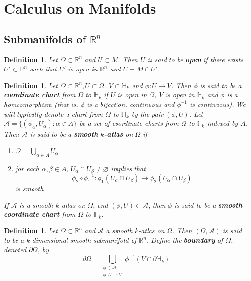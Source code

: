\documentclass[12pt]{amsart}
\newtheorem{defn}[thm]{Definition}
\newcommand{\al}{\alpha}
\newcommand{\Om}{\Omega}
\renewcommand{\H}{\mathbb{H}}
\newcommand{\R}{\mathbb{R}}
\newcommand{\MA}{\mathcal{A}}
\begin{document}
	

	
	
	

	
	\newpage	
	\section{Calculus on Manifolds}
	
	\subsection{Submanifolds of $\R^n$}
	
	\begin{defn}
		Let $\Om \subset \R^n$ and $U \subset M$. Then $U$ is said to be \textbf{open} if there exists $U' \subset \R^n$ such that $U'$ is open in $\R^n$ and $U = M \cap U'$.
	\end{defn}

	\begin{defn}
		Let $\Om \subset \R^n, U \subset \Om$, $V \subset \H_k$ and $\phi:U \rightarrow V$. Then $\phi$ is said to be a \textbf{coordinate chart} from $\Om$ to $\H_k$ if $U$ is open in $\Om$, $V$ is open in $\H_k$ and $\phi$ is a homeomorphism (that is, $\phi$ is a bijection, continuous and $\phi^{-1}$ is continuous). We will typically denote a chart from $\Om$ to $\H_k$ by the pair $(\phi, U)$. Let $\MA = \{(\phi_{\al}, U_{\al}): \al \in A\}$ be a set of coordinate charts from $\Om$ to $\H_k$ indexed by $A$. Then $\MA$ is said to be a \textbf{smooth $k$-atlas} on $\Om$ if 
		\begin{enumerate}
			\item $\Om = \bigcup\limits_{\al \in A} U_{\al}$
			\item for each $\al, \beta \in A$, $U_{\al} \cap U_{\beta} \neq \varnothing$ implies that $$\phi_2 \circ \phi_1^{-1}: \phi_1(U_{\al} \cap U_{\beta}) \rightarrow \phi_2(U_{\al} \cap U_{\beta})$$ is  smooth
		\end{enumerate} 
	If $\MA$ is a smooth $k$-atlas on $\Om$, and $(\phi, U) \in \MA$, then $\phi$ is said to be a \textbf{smooth coordinate chart} from $\Om$ to $\H_k$. 
	\end{defn}

	\begin{defn}
		Let $\Om \subset \R^n$ and $\MA$ a smooth $k$-atlas on $\Om$. Then $(\Om, \MA)$ is said to be a $k$-dimensional smooth submanifold of $\R^n$. Define the \textbf{boundary} of $\Om$, denoted $\partial \Om$, by $$\partial \Om = \bigcup_{\substack{\phi \in \MA \\ \phi:U \rightarrow V}} \phi^{-1}(V \cap \partial \H_k) $$
	\end{defn}
	
\end{document}
